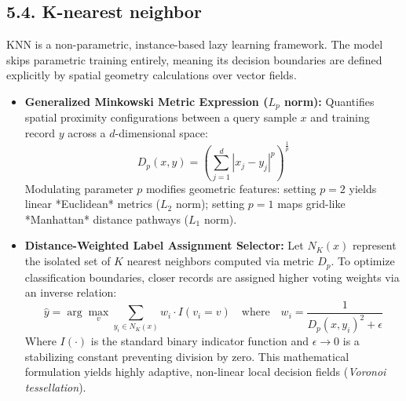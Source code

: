 \documentclass[11pt,a4paper]{article}
\begin{document}
\subsection{5.4. K-nearest neighbor}
KNN is a non-parametric, instance-based lazy learning framework. The model skips parametric training entirely, meaning its decision boundaries are defined explicitly by spatial geometry calculations over vector fields.
\begin{itemize}
    \item \textbf{Generalized Minkowski Metric Expression ($L_p$ norm):} Quantifies spatial proximity configurations between a query sample $x$ and training record $y$ across a $d$-dimensional space:
    \begin{equation}
        D_p(x, y) = \left( \sum_{j=1}^{d} |x_j - y_j|^p \right)^{\frac{1}{p}}
    \end{equation}
    Modulating parameter $p$ modifies geometric features: setting $p=2$ yields linear *Euclidean* metrics ($L_2$ norm); setting $p=1$ maps grid-like *Manhattan* distance pathways ($L_1$ norm).
    \item \textbf{Distance-Weighted Label Assignment Selector:} Let $N_K(x)$ represent the isolated set of $K$ nearest neighbors computed via metric $D_p$. To optimize classification boundaries, closer records are assigned higher voting weights via an inverse relation:
    \begin{equation}
        \hat{y} = \arg\max_{v} \sum_{y_i \in N_K(x)} w_i \cdot I(v_i = v) \quad \text{where} \quad w_i = \frac{1}{D_p(x, y_i)^2 + \epsilon}
    \end{equation}
    Where $I(\cdot)$ is the standard binary indicator function and $\epsilon \rightarrow 0$ is a stabilizing constant preventing division by zero. This mathematical formulation yields highly adaptive, non-linear local decision fields (\textit{Voronoi tessellation}).
\end{itemize}
\end{document}
